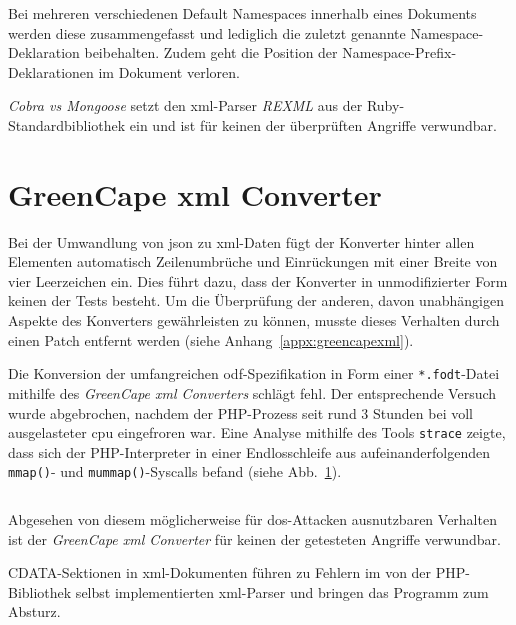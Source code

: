 Bei mehreren verschiedenen Default Namespaces innerhalb eines Dokuments werden diese zusammengefasst und lediglich die zuletzt genannte Namespace-Deklaration beibehalten. Zudem geht die Position der Namespace-Prefix-Deklarationen im Dokument verloren.

\emph{Cobra vs Mongoose} setzt den \acrshort{xml}-Parser \emph{REXML} aus der Ruby\hyp{}Standardbibliothek ein und ist für keinen der überprüften Angriffe verwundbar.

\section{GreenCape \acrshort{xml} Converter}
\label{sec:greencapexml}

Bei der Umwandlung von \acrshort{json} zu \acrshort{xml}-Daten fügt der Konverter hinter allen Elementen automatisch Zeilen\-umbrüche und Einrückungen mit einer Breite von vier Leerzeichen ein. Dies führt dazu, dass der Konverter in unmodifizierter Form keinen der Tests besteht. Um die Überprüfung der anderen, davon unabhängigen Aspekte des Konverters gewährleisten zu können, musste dieses Verhalten durch einen Patch entfernt werden (siehe Anhang~\ref{appx:greencapexml}).

Die Konversion der umfangreichen \acrshort{odf}-Spezifikation in Form einer \texttt{*.fodt}-Datei mithilfe des \emph{GreenCape \acrshort{xml} Converters} schlägt fehl. Der entsprechende Versuch wurde abgebrochen, nachdem der PHP-Prozess seit rund 3 Stunden bei voll ausgelasteter \acrshort{cpu} eingefroren war. Eine Analyse mithilfe des Tools \texttt{strace} zeigte, dass sich der PHP-Interpreter in einer Endlosschleife aus aufeinanderfolgenden \texttt{mmap()}- und \texttt{mummap()}-Syscalls befand (siehe Abb.~\ref{fig:greencapeloop}).

\begin{figure}[bp!]
    \inputminted{shell-session}{greencapexml-strace.txt}
    \label{fig:greencapeloop}
\end{figure}

Abgesehen von diesem möglicherweise für \acrshort{dos}-Attacken ausnutzbaren Verhalten ist der \emph{GreenCape \acrshort{xml} Converter} für keinen der getesteten Angriffe verwundbar.

CDATA-Sektionen in \acrshort{xml}-Dokumenten führen zu Fehlern im von der PHP-Bibliothek selbst implementierten \acrshort{xml}-Parser und bringen das Programm zum Absturz.

